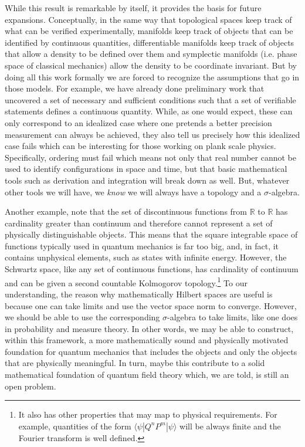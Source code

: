\documentclass[letterpaper]{article}
\theoremstyle{plain}%
\theoremstyle{definition}
\theoremstyle{remark}
\numberwithin{equation}{section}
\begin{document}
While this result is remarkable by itself, it provides the basis for future expansions. Conceptually, in the same way that topological spaces keep track of what can be verified experimentally, manifolds keep track of objects that can be identified by continuous quantities, differentiable manifolds keep track of objects that allow a density to be defined over them and symplectic manifolds (i.e. phase space of classical mechanics) allow the density to be coordinate invariant. But by doing all this work formally we are forced to recognize the assumptions that go in those models. For example, we have already done preliminary work that uncovered a set of necessary and sufficient conditions such that a set of verifiable statements defines a continuous quantity. While, as one would expect, these can only correspond to an idealized case where one pretends a better precision measurement can always be achieved, they also tell us precisely how this idealized case fails which can be interesting for those working on plank scale physics. Specifically, ordering must fail which means not only that real number cannot be used to identify configurations in space and time, but that basic mathematical tools such as derivation and integration will break down as well. But, whatever other tools we will have, we \emph{know} we will always have a topology and a $\sigma$-algebra.

Another example, note that the set of discontinuous functions from $\mathbb{R}$ to $\mathbb{R}$ has cardinality greater than continuum and therefore cannot represent a set of physically distinguishable objects. This means that the square integrable space of functions typically used in quantum mechanics is far too big, and, in fact, it contains unphysical elements, such as states with infinite energy. However, the Schwartz space, like any set of continuous functions, has cardinality of continuum and can be given a second countable Kolmogorov topology.\footnote{It also has other properties that may map to physical requirements. For example, quantities of the form $\langle \psi|Q^n P^m|\psi\rangle$ will be always finite and the Fourier transform is well defined.} To our understanding, the reason why mathematically Hilbert spaces are useful is because one can take limits and use the vector space norm to converge. However, we should be able to use the corresponding $\sigma$-algebra to take limits, like one does in probability and measure theory. In other words, we may be able to construct, within this framework, a more mathematically sound and physically motivated foundation for quantum mechanics that includes the objects and only the objects that are physically meaningful. In turn, maybe this contribute to a solid mathematical foundation of quantum field theory which, we are told, is still an open problem.
\end{document}

